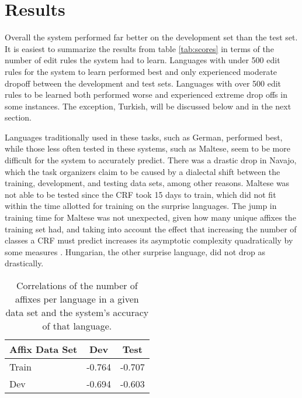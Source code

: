 \documentclass[11pt]{article}
\begin{document}
\section*{Results}
Overall the system performed far better on the development set than the test set.
It is easiest to summarize the results from table \ref{tab:scores} in terms of the number of edit rules the system had to learn. 
Languages with under 500 edit rules for the system to learn performed best and only experienced moderate dropoff between the development and test sets.
Languages with over 500 edit rules to be learned both performed worse and experienced extreme drop offs in some instances. 
The exception, Turkish, will be discussed below and in the next section.

Languages traditionally used in these tasks, such as German, performed best, while those less often tested in these systems, such as Maltese, seem to be more difficult for the system to accurately predict.
There was a drastic drop in Navajo, which the task organizers claim to be caused by a dialectal shift between the training, development, and testing data sets, among other reasons. 
Maltese was not able to be tested since the CRF took 15 days to train, which did not fit within the time allotted for training on the surprise languages.
The jump in training time for Maltese was not unexpected, given how many unique affixes the training set had, and taking into account the effect that increasing the number of classes a CRF must predict increases its asymptotic complexity quadratically by some measures \cite{cohn2007scaling}. 
Hungarian, the other surprise language, did not drop as drastically.

\begin{table}
	\centering
	\begin{tabular}{l|c c}
Affix Data Set & Dev & Test\\\hline
Train	&	-0.764	&	-0.707	\\
Dev	&	-0.694	&	-0.603	\\
    \end{tabular}
    \caption{Correlations of the number of affixes per language in a given data set and the system's accuracy of that language.}
    \label{tab:correlation}
\end{table}
\end{document}
